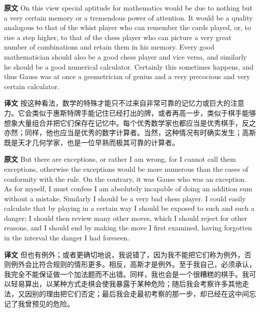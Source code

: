 \documentclass[UTF8]{ctexart}
\newenvironment{english}{\par\small\noindent\textbf{原文}\quad\ignorespaces}{\par}
\newenvironment{zhtranslation}{\par\noindent\textbf{译文}\quad\ignorespaces}{\par\vspace{0.35em}}
\begin{document}
\begin{english}
On this view special aptitude for mathematics would be due to nothing but a very certain memory or a tremendous power of attention. It would be a quality analogous to that of the whist player who can remember the cards played, or, to rise a step higher, to that of the chess player who can picture a very great number of combinations and retain them in his memory. Every good mathematician should also be a good chess player and vice versa, and similarly he should be a good numerical calculator. Certainly this sometimes happens, and thus Gauss was at once a geometrician of genius and a very precocious and very certain calculator.
\end{english}
\begin{zhtranslation}
按这种看法，数学的特殊才能只不过来自非常可靠的记忆力或巨大的注意力。它会类似于惠斯特牌手能记住已经打出的牌，或者再高一步，类似于棋手能够想象大量组合并把它们保存在记忆中。每个优秀数学家也都应当是优秀棋手，反之亦然；同样，他也应当是优秀的数字计算者。当然，这种情况有时确实发生；高斯既是天才几何学家，也是一位早熟而极其可靠的计算者。\end{zhtranslation}

\begin{english}
But there are exceptions, or rather I am wrong, for I cannot call them exceptions, otherwise the exceptions would be more numerous than the cases of conformity with the rule. On the contrary, it was Gauss who was an exception. As for myself, I must confess I am absolutely incapable of doing an addition sum without a mistake. Similarly I should be a very bad chess player. I could easily calculate that by playing in a certain way I should be exposed to such and such a danger; I should then review many other moves, which I should reject for other reasons, and I should end by making the move I first examined, having forgotten in the interval the danger I had foreseen.
\end{english}
\begin{zhtranslation}
但也有例外；或者更确切地说，我说错了，因为我不能把它们称为例外，否则例外会比符合规则的情形更多。相反，高斯才是例外。至于我自己，必须承认，我完全不能保证做一个加法题而不出错。同样，我也会是一个很糟糕的棋手。我可以轻易算出，以某种方式走棋会使我暴露于某种危险；随后我会考察许多其他走法，又因别的理由把它们否定；最后我会走最初考察的那一步，却已经在这中间忘记了我曾预见的危险。\end{zhtranslation}
\end{document}
